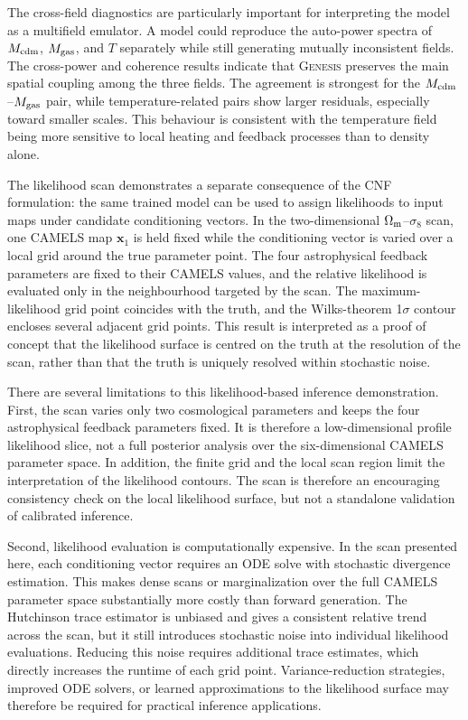 \documentclass{article}
\newcommand{\Mcdm}{M_{\rm cdm}}
\newcommand{\Mgas}{M_{\rm gas}}
\newcommand{\Tgas}{T}
\newcommand{\Om}{\Omega_{\rm m}}
\newcommand{\sig}{\sigma_8}
\begin{document}
The cross-field diagnostics are particularly important for interpreting
the model as a multifield emulator. A model could reproduce the
auto-power spectra of $\Mcdm$, $\Mgas$, and $\Tgas$ separately while
still generating mutually inconsistent fields. The cross-power and
coherence results indicate that \textsc{Genesis} preserves the main
spatial coupling among the three fields. The agreement is strongest
for the $\Mcdm$--$\Mgas$ pair, while temperature-related pairs show
larger residuals, especially toward smaller scales. This behaviour is
consistent with the temperature field being more sensitive to local
heating and feedback processes than to density alone.

The likelihood scan demonstrates a separate consequence of the CNF
formulation: the same trained model can be used to assign likelihoods
to input maps under candidate conditioning vectors. In the
two-dimensional $\Om$--$\sig$ scan, one CAMELS map $\mathbf{x}_1$ is
held fixed while the conditioning vector is varied over a local grid
around the true parameter point. The four astrophysical feedback
parameters are fixed to their CAMELS values, and the relative
likelihood is evaluated only in the neighbourhood targeted by the
scan. The maximum-likelihood grid point coincides with the truth, and
the Wilks-theorem 1$\sigma$ contour encloses several adjacent grid
points. This result is interpreted as a proof of concept that the
likelihood surface is centred on the truth at the resolution of the
scan, rather than that the truth is uniquely resolved within stochastic
noise.

There are several limitations to this likelihood-based inference
demonstration. First, the scan varies only two cosmological parameters
and keeps the four astrophysical feedback parameters fixed. It is
therefore a low-dimensional profile likelihood slice, not a full
posterior analysis over the six-dimensional CAMELS parameter space. In
addition, the finite grid and the local scan region limit the
interpretation of the likelihood contours. The scan is therefore an
encouraging consistency check on the local likelihood surface, but not
a standalone validation of calibrated inference.

Second, likelihood evaluation is computationally expensive. In the
scan presented here, each conditioning vector requires an ODE solve
with stochastic divergence estimation. This makes dense scans or
marginalization over the full CAMELS parameter space substantially more
costly than forward generation. The Hutchinson trace estimator is
unbiased and gives a consistent relative trend across the scan, but it
still introduces stochastic noise into individual likelihood
evaluations. Reducing this noise requires additional trace estimates,
which directly increases the runtime of each grid point.
Variance-reduction strategies, improved ODE solvers, or learned
approximations to the likelihood surface may therefore be required for
practical inference applications.
\end{document}
